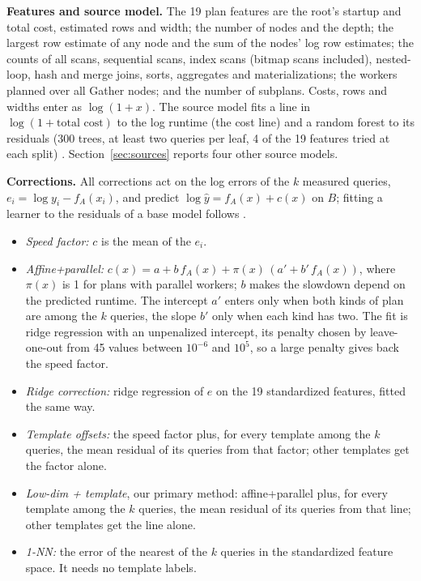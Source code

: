 \documentclass[sigconf,review]{acmart}
\begin{document}
\textbf{Features and source model.} The 19 plan features are the root's
startup and total cost, estimated rows and width; the number of nodes and
the depth; the largest row estimate of any node and the sum of the nodes'
log row estimates; the counts of all scans, sequential scans, index scans
(bitmap scans included), nested-loop, hash and merge joins, sorts,
aggregates and materializations; the workers planned over all Gather nodes;
and the number of subplans. Costs, rows and widths enter as $\log(1+x)$.
The source model fits a line in $\log(1+\text{total cost})$ to the log
runtime (the cost line) and a random forest to its residuals (300 trees,
at least two queries per leaf, 4 of the 19 features tried at each split)
\cite{breiman2001,pedregosa2011}. Section~\ref{sec:sources} reports four
other source models.

\textbf{Corrections.} All corrections act on the log errors of the $k$
measured queries, $e_i = \log y_i - f_A(x_i)$, and predict
$\log \hat y = f_A(x) + c(x)$ on $B$; fitting a learner to the residuals
of a base model follows \cite{didona2015}.
\begin{itemize}
\item \emph{Speed factor:} $c$ is the mean of the $e_i$.
\item \emph{Affine+parallel:} $c(x) = a + b\,f_A(x) + \pi(x)\,(a' + b'\,f_A(x))$,
  where $\pi(x)$ is 1 for plans with parallel workers; $b$ makes the
  slowdown depend on the predicted runtime. The intercept $a'$ enters only
  when both kinds of plan are among the $k$ queries, the slope $b'$ only
  when each kind has two. The fit is ridge regression \cite{hoerl1970}
  with an unpenalized intercept, its penalty chosen by leave-one-out
  \cite{golub1979} from 45 values between $10^{-6}$ and $10^{5}$, so a large
  penalty gives back the speed factor.
\item \emph{Ridge correction:} ridge regression of $e$ on the 19
  standardized features, fitted the same way.
\item \emph{Template offsets:} the speed factor plus, for every template
  among the $k$ queries, the mean residual of its queries from that factor;
  other templates get the factor alone.
\item \emph{Low-dim + template}, our primary method: affine+parallel plus,
  for every template among the $k$ queries, the mean residual of its
  queries from that line; other templates get the line alone.
\item \emph{1-NN:} the error of the nearest of the $k$ queries in the
  standardized feature space. It needs no template labels.
\end{itemize}
\end{document}
